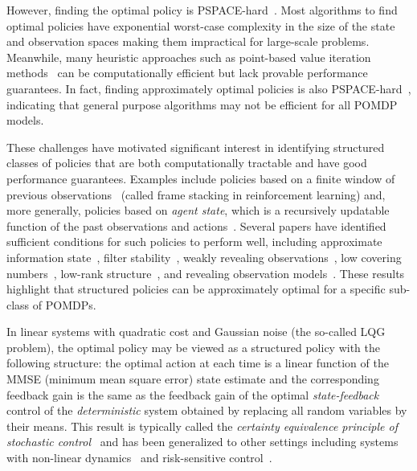 \documentclass[letterpaper, 10pt]{IEEEtran}
\theoremstyle{plain}
\theoremstyle{nonumberplain}
\theoremstyle{plain}
\begin{document}
However, finding the optimal policy is PSPACE-hard~\cite{papadimitriou1987complexity}. Most algorithms to find optimal policies have exponential worst-case complexity in the size of the state and observation spaces making them impractical for large-scale problems. Meanwhile, many heuristic approaches such as point-based value iteration methods~\cite{shani2013survey} can be computationally efficient but lack provable performance guarantees. In fact, finding approximately optimal policies is also PSPACE-hard~\cite{burago1996complexity,lusena2001nonapproximability}, indicating that general purpose algorithms may not be efficient for all POMDP models.

These challenges have motivated significant interest in identifying structured classes of policies that are both computationally tractable and have good performance guarantees. Examples include policies based on a finite window of previous observations~\cite{white1994finite} (called frame stacking in reinforcement learning) and, more generally, policies based on \emph{agent state}, which is a recursively updatable function of the past observations and actions~\cite{vanroy2021simple,sinha2024agent}. 
Several papers have identified sufficient conditions for such policies to perform well, including approximate information state~\cite{AIS}, filter stability~\cite{mcdonald2022robustness,kara2022near,golowich}, weakly revealing observations~\cite{liu2022partially}, low covering numbers~\cite{lee2007makes}, low-rank structure~\cite{guo2023provably}, and revealing observation models~\cite{belly2025revelations}.  These results highlight that structured policies can be approximately optimal for a specific sub-class of POMDPs. 

In linear systems with quadratic cost and Gaussian noise (the so-called LQG problem), the optimal policy may be viewed as a structured policy with the following structure: the optimal action at each time is a linear function of the MMSE (minimum mean square error) state estimate and the corresponding feedback gain is the same as the feedback gain of the optimal \emph{state-feedback} control of the \emph{deterministic} system obtained by replacing all random variables by their means. This result is typically called the \emph{certainty equivalence principle of stochastic control}~\cite{Theil1954,Theil1957,simon1956dynamic} and has been generalized to other settings including systems with non-linear dynamics~\cite{bar1974dual,derpich2022dual,li2025semilinear} and risk-sensitive control~\cite{whittle1986risk}.
\end{document}
